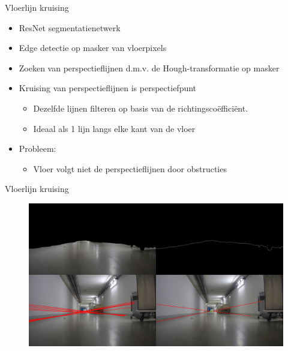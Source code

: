\documentclass[11pt,t]{beamer}
\begin{document}
\begin{frame}[fragile]{Vloerlijn kruising}
	\begin{itemize}
		\item ResNet segmentatienetwerk
		\item Edge detectie op masker van vloerpixels
		\item Zoeken van perspectieflijnen d.m.v. de Hough-transformatie op masker
		\item Kruising van perspectieflijnen is perspectiefpunt
		\begin{itemize}
			\item Dezelfde lijnen filteren op basis van de richtingsco\"{e}ffici\"{e}nt.
			\item Ideaal als 1 lijn langs elke kant van de vloer
		\end{itemize}
		
		\item Probleem:
		\begin{itemize}
			\item Vloer volgt niet de perspectieflijnen door obstructies
		\end{itemize}
		
	\end{itemize}
\end{frame}

\begin{frame}[fragile]{Vloerlijn kruising}
	\begin{figure}
		\centering
		\tiny
		\includegraphics[width=\textwidth]{graphics/hough_floor.png}
	\end{figure}
\end{frame}
\end{document}
